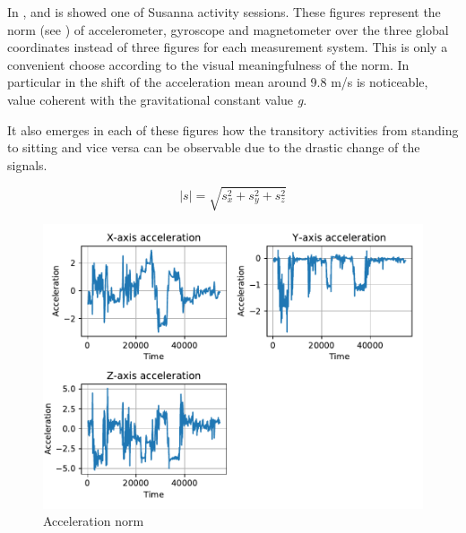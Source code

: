 In ,  and  is showed one of Susanna activity sessions. These figures represent the norm (see ) of accelerometer, gyroscope and magnetometer over the three global coordinates instead of three figures for each measurement system. This is only a convenient choose according to the visual meaningfulness of the norm. In particular in  the shift of the acceleration mean around 9.8 m/s is noticeable, value coherent with the gravitational constant value \textit{g}.

It also emerges in each of these figures how the transitory activities from standing to sitting and vice versa can be observable due to the drastic change of the signals.


\begin{equation}
|s| = \sqrt{s_x^2+s_y^2+s_z^2}
\label{eq:norm}
\end{equation}



\begin{figure}[htp]
\includegraphics[scale=0.55]{acceleration_susanna.pdf}
\caption{Acceleration norm}
\label{fig:acc}
\end{figure}

